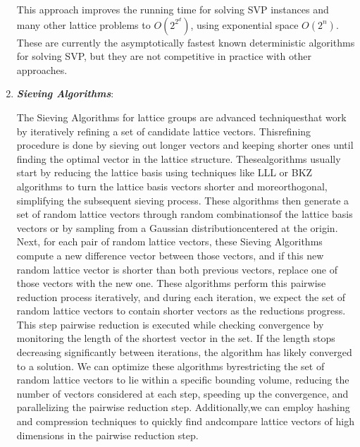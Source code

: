 \documentclass[runningheads]{llncs}
\numberwithin{equation}{section}
\begin{document}
\begin{enumerate}
        This approach improves the running time for solving SVP instances and many other lattice problems to $O({2}^{{2}^{d}})$, using exponential space $O({2}^{n})$. These are currently the asymptotically fastest known deterministic algorithms for solving SVP, but they are not competitive in practice with other approaches.

        \vspace{2ex}
        \item \textbf{\textit{Sieving Algorithms}}:
        \vspace{0.6ex}

        The Sieving Algorithms \cite{ajtai-kumar-sivakumar:sieve-algorithm-shortest-lattice-vector-problem:2001:06-2024,nguyen-vidick:sieve-algorithms-shortest-vector-problem-practical:2008:06-2024,micciancio-voulgaris:faster-exponential-time-algorithms-shortest-vector-problem:2010:06-2024,hanrot-pujol-stehle:algorithms-shortest-and-closest-lattice-vector-problems:2011:06-2024} for lattice groups are advanced techniques\break that work by iteratively refining a set of candidate lattice vectors. This\break refining procedure is done by sieving out longer vectors and keeping shorter ones until finding the optimal vector in the lattice structure. These\break algorithms usually start by reducing the lattice basis using techniques like LLL or BKZ algorithms to turn the lattice basis vectors shorter and more\break orthogonal, simplifying the subsequent sieving process. These algorithms then generate a set of random lattice vectors through random combinations\break of the lattice basis vectors or by sampling from a Gaussian distribution\break centered at the origin. Next, for each pair of random lattice vectors, these Sieving Algorithms compute a new difference vector between those vectors, and if this new random lattice vector is shorter than both previous vectors, replace one of those vectors with the new one. These algorithms perform this pairwise reduction process iteratively, and during each iteration, we expect the set of random lattice vectors to contain shorter vectors as the reductions progress. This step pairwise reduction is executed while checking convergence by monitoring the length of the shortest vector in the set. If the length stops decreasing significantly between iterations, the algorithm has likely converged to a solution. We can optimize these algorithms by\break restricting the set of random lattice vectors to lie within a specific bounding volume, reducing the number of vectors considered at each step, speeding up the convergence, and parallelizing the pairwise reduction step. Additionally,\break we can employ hashing and compression techniques to quickly find and\break compare lattice vectors of high dimensions in the pairwise reduction step.


\end{enumerate}
\end{document}
